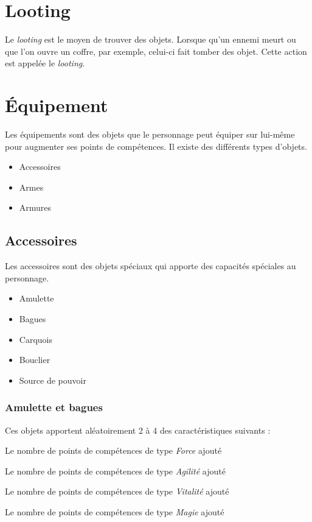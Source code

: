 \documentclass[11pt, a4paper, oneside]{report}
\begin{document}
\section{Looting}
Le \emph{looting} est le moyen de trouver des objets. Lorsque qu'un ennemi meurt ou que l'on ouvre un coffre, par exemple, celui-ci fait tomber des objet. Cette action est appelée le \emph{looting}.
\section{Équipement}
Les équipements sont des objets que le personnage peut équiper sur lui-même pour augmenter ses points de compétences. Il existe des différents types d'objets.
\begin{itemize}
	\item Accessoires
	\item Armes
	\item Armures
\end{itemize}
\subsection{Accessoires}
\label{subsec:accessoires}
Les accessoires sont des objets spéciaux qui apporte des capacités spéciales au personnage.
\begin{multicols}{2}
\begin{itemize}
    \item Amulette
    \item Bagues
    \item Carquois
    \item Bouclier
    \item Source de pouvoir
\end{itemize}
\end{multicols}
\subsubsection{Amulette et bagues}
Ces objets apportent aléatoirement 2 à 4 des caractéristiques suivants :
\begin{description}[labelindent=1cm]
    \item[Force] Le nombre de points de compétences de type \emph{Force} ajouté
    \item[Agilité] Le nombre de points de compétences de type \emph{Agilité} ajouté
    \item[Vitalité] Le nombre de points de compétences de type \emph{Vitalité} ajouté
    \item[Magie] Le nombre de points de compétences de type \emph{Magie} ajouté
\end{description}
\end{document}

